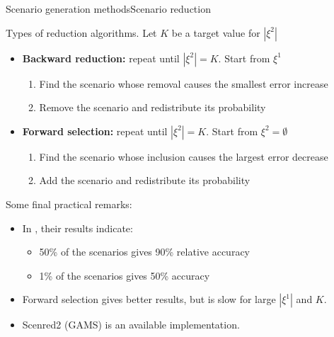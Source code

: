\begin{frame}{Scenario generation methods}{Scenario reduction}

	Types of reduction algorithms. Let $K$ be a target value for $|\xi^2|$
	\vspace{-6pt}
	\begin{itemize}
		\item {\bf Backward reduction:} repeat until $|\xi^2|=K$. Start from $\xi^1$ 
		\begin{enumerate}
			\item Find the scenario whose removal causes the \alert{smallest error increase}
			\item Remove the scenario and redistribute its probability
		\end{enumerate} 
		\item {\bf Forward selection:} repeat until $|\xi^2|=K$. Start from $\xi^2 = \emptyset$
		\begin{enumerate}
			\item Find the scenario whose inclusion causes the \alert{largest error decrease}
			\item Add the scenario and redistribute its probability
		\end{enumerate} 
	\end{itemize}
	
	\pause
	Some final practical remarks:
	\vspace{-6pt}
	\begin{itemize}
		\item In {\small \cite{heitsch2003scenario}}, their results indicate:
		\begin{itemize}
			\item 50\% of the scenarios gives 90\% relative accuracy
			\item 1\% of the scenarios gives 50\% accuracy
		\end{itemize}
		\item \alert{Forward selection} gives better results, but is slow for large $|\xi^1|$ and $K$.
		\item \alert{Scenred2} (GAMS) is an available implementation.		
	\end{itemize} 
	
\end{frame}

